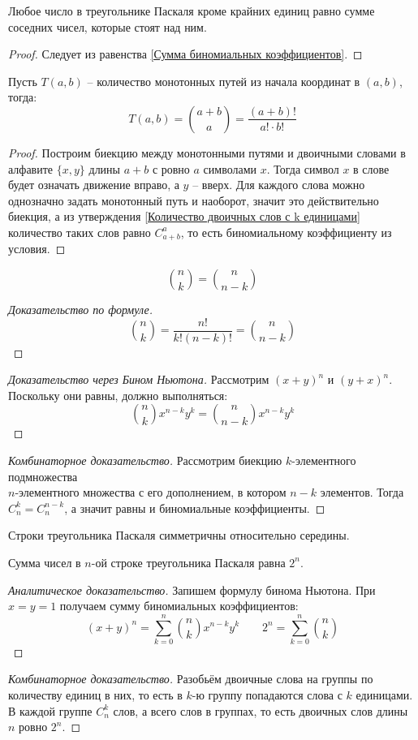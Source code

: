 \documentclass[12pt]{article}
\begin{document}
\begin{statement}
	Любое число в треугольнике Паскаля кроме крайних единиц равно сумме
	соседних чисел, которые стоят над ним.
	\begin{proof}
		Следует из равенства \ref{Сумма биномиальных коэффициентов}.
	\end{proof}
\end{statement}
\begin{statement}
	Пусть $T(a, b)$ -- количество монотонных путей из начала координат в
	$(a, b)$, тогда:
	\[T(a, b)=\binom{a+b}{a}=\frac{(a+b)!}{a!\cdot b!}\]	
	\begin{proof}
		Построим биекцию между монотонными путями и двоичными словами в
		алфавите $\{x, y\}$ длины $a+b$ с ровно $a$ символами $x$. Тогда
		символ $x$ в слове будет означать движение вправо, а $y$ -- вверх.
		Для каждого слова можно однозначно задать монотонный путь и
		наоборот, значит это действительно биекция, а из утверждения
		\ref{Количество двоичных слов с k единицами} количество таких слов
		равно $C_{a+b}^a$, то есть биномиальному коэффициенту из условия.
	\end{proof}
\end{statement}
\begin{statement}
	\[\binom{n}{k}=\binom{n}{n-k}\]	
	\begin{proof}[Доказательство по формуле]
		\[\binom{n}{k}=\frac{n!}{k!(n-k)!}=\binom{n}{n-k}\]	
	\end{proof}
	\begin{proof}[Доказательство через Бином Ньютона]
		Рассмотрим $(x+y)^n$ и $(y+x)^n$. Поскольку они равны, должно выполняться:
		\[\binom{n}{k}x^{n-k}y^k=\binom{n}{n-k}x^{n-k}y^k\]	
	\end{proof}
	\begin{proof}[Комбинаторное доказательство]
		Рассмотрим биекцию $k$-элементного подмножества\\$n$-элементного
		множества с его дополнением, в котором
		$n-k$ элементов. Тогда $C_n^k=C_n^{n-k}$, а значит равны и
		биномиальные коэффициенты.
	\end{proof}
\end{statement}
\begin{consequence}
	Строки треугольника Паскаля симметричны относительно середины.
\end{consequence}
\begin{statement}
	Сумма чисел в $n$-ой строке треугольника Паскаля равна $2^n$.
	\begin{proof}[Аналитическое доказательство]
		Запишем формулу бинома Ньютона. При $x=y=1$ получаем сумму
		биномиальных коэффициентов:
		\[(x+y)^n=\sum_{k=0}^{n}\binom{n}{k}x^{n-k}y^k\qquad2^n=\sum_{k=0}^{n}\binom{n}{k}\]	
	\end{proof}
	\begin{proof}[Комбинаторное доказательство]
		Разобьём двоичные слова на группы по количеству единиц в них, то
		есть в $k$-ю группу попадаются слова с $k$ единицами. В каждой
		группе $C_n^k$ слов, а всего слов в группах, то есть двоичных слов
		длины $n$ ровно $2^n$.
	\end{proof}
\end{statement}
\end{document}
